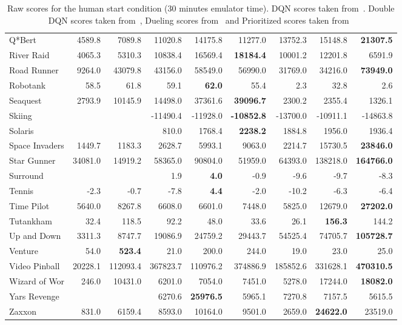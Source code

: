 \documentclass{article} %
\begin{document}
\begin{table}[h]
\begin{scriptsize}
\begin{tabular}{lrrrrrrrr}
Q*Bert & 4589.8 & 7089.8 & 11020.8 & 14175.8 & 11277.0 & 13752.3 & 15148.8 & \textbf{21307.5}\\
River Raid & 4065.3 & 5310.3 & 10838.4 & 16569.4 & \textbf{18184.4} & 10001.2 & 12201.8 & 6591.9\\
Road Runner & 9264.0 & 43079.8 & 43156.0 & 58549.0 & 56990.0 & 31769.0 & 34216.0 & \textbf{73949.0}\\
Robotank & 58.5 & 61.8 & 59.1 & \textbf{62.0} & 55.4 & 2.3 & 32.8 & 2.6\\
Seaquest & 2793.9 & 10145.9 & 14498.0 & 37361.6 & \textbf{39096.7} & 2300.2 & 2355.4 & 1326.1\\
Skiing &  &  & -11490.4 & -11928.0 & \textbf{-10852.8} & -13700.0 & -10911.1 & -14863.8\\
Solaris &  &  & 810.0 & 1768.4 & \textbf{2238.2} & 1884.8 & 1956.0 & 1936.4\\
Space Invaders & 1449.7 & 1183.3 & 2628.7 & 5993.1 & 9063.0 & 2214.7 & 15730.5 & \textbf{23846.0}\\
Star Gunner & 34081.0 & 14919.2 & 58365.0 & 90804.0 & 51959.0 & 64393.0 & 138218.0 & \textbf{164766.0}\\
Surround &  &  & 1.9 & \textbf{4.0} & -0.9 & -9.6 & -9.7 & -8.3\\
Tennis & -2.3 & -0.7 & -7.8 & \textbf{4.4} & -2.0 & -10.2 & -6.3 & -6.4\\
Time Pilot & 5640.0 & 8267.8 & 6608.0 & 6601.0 & 7448.0 & 5825.0 & 12679.0 & \textbf{27202.0}\\
Tutankham & 32.4 & 118.5 & 92.2 & 48.0 & 33.6 & 26.1 & \textbf{156.3} & 144.2\\
Up and Down & 3311.3 & 8747.7 & 19086.9 & 24759.2 & 29443.7 & 54525.4 & 74705.7 & \textbf{105728.7}\\
Venture & 54.0 & \textbf{523.4} & 21.0 & 200.0 & 244.0 & 19.0 & 23.0 & 25.0\\
Video Pinball & 20228.1 & 112093.4 & 367823.7 & 110976.2 & 374886.9 & 185852.6 & 331628.1 & \textbf{470310.5}\\
Wizard of Wor & 246.0 & 10431.0 & 6201.0 & 7054.0 & 7451.0 & 5278.0 & 17244.0 & \textbf{18082.0}\\
Yars Revenge &  &  & 6270.6 & \textbf{25976.5} & 5965.1 & 7270.8 & 7157.5 & 5615.5\\
Zaxxon & 831.0 & 6159.4 & 8593.0 & 10164.0 & 9501.0 & 2659.0 & \textbf{24622.0} & 23519.0\\

    \end{tabular}
    \end{scriptsize}
    \caption{\label{fig-atari-full} Raw scores for the human start condition (30 minutes emulator time). DQN scores taken from~\cite{nair2015gorila}. Double DQN scores taken from~\cite{hado2015doubledqn}, Dueling scores from~\cite{wang2015dueling} and Prioritized scores taken from~\cite{schaul2015prioritized}}
\end{table}
\end{document}
